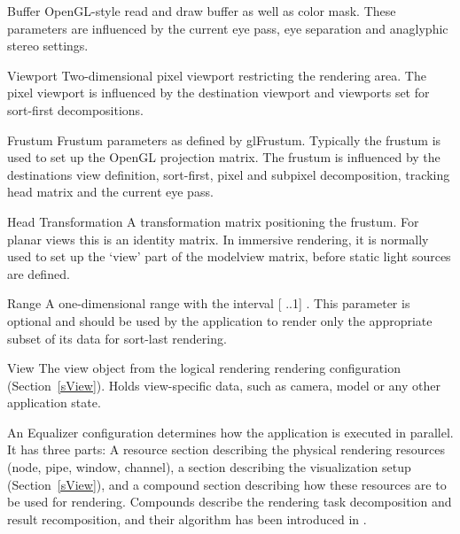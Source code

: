 \documentclass[10pt,journal,compsoc]{IEEEtran}
\newcommand{\sref}[1]{Section~\ref{#1}}
\providecommand{\DIFaddtex}[1]{{\protect\color{blue} \sf #1}} %
\providecommand{\DIFadd}[1]{\texorpdfstring{\DIFaddtex{#1}}{#1}} %
\begin{document}
\begin{compactdesc}

 \item[Buffer] \DIFadd{OpenGL-style read and draw buffer as well as color mask. These
 parameters are influenced by the current eye pass, eye separation and
 anaglyphic stereo settings.
}

 \item[Viewport] \DIFadd{Two-dimensional pixel viewport restricting the rendering area.
 The pixel viewport is influenced by the destination viewport and viewports set
 for sort-first decompositions.
}

 \item[Frustum] \DIFadd{Frustum parameters as defined by \textsf{glFrustum}. Typically
 the frustum is used to set up the OpenGL projection matrix. The frustum is
 influenced by the destinations view definition, sort-first, pixel and subpixel
 decomposition, tracking head matrix and the current eye pass.
}

 \item[Head Transformation] \DIFadd{A transformation matrix positioning the frustum.
 For planar views this is an identity matrix. In immersive rendering, it is
 normally used to set up the `view' part of the modelview matrix, before static
 light sources are defined.
}

 \item[Range] \DIFadd{A one-dimensional range with the interval }[\DIFadd{0..1}]\DIFadd{. This parameter is
 optional and should be used by the application to render only the appropriate
 subset of its data for sort-last rendering.
}

\item[View] \DIFadd{The view object from the logical rendering rendering configuration
(\sref{sView}). Holds view-specific data, such as camera, model or any other
application state.
}

\end{compactdesc}

\DIFadd{An Equalizer configuration determines how the application is executed in
parallel. It has three parts: A resource section describing the physical
rendering resources (node, pipe, window, channel), a section describing the
visualization setup (\sref{sView}), and a compound section describing how these
resources are to be used for rendering. Compounds describe the rendering task
decomposition and result recomposition, and their algorithm has been introduced
in \cite{EMP:09}.
}
\end{document}
